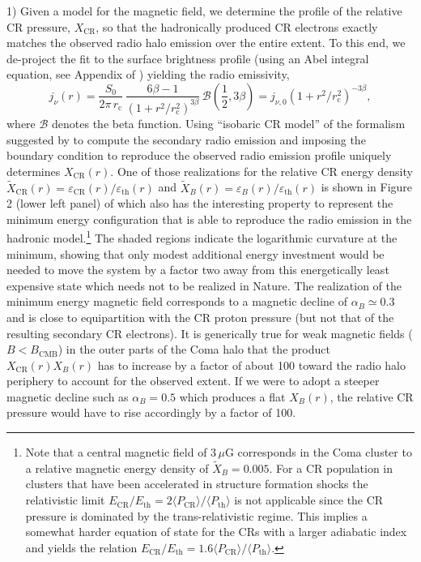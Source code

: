 \documentclass[12pt,manuscript]{aastex}
\newcommand{\rmn}{\mathrm}
\newcommand{\CR}{\mathrm{CR}}
\newcommand{\eps}{\varepsilon}
\newcommand{\bra}{\langle}
\newcommand{\ket}{\rangle}
\begin{document}
1) Given a model for the magnetic field, we determine the profile of the
relative CR pressure, $X_\CR$, so that the hadronically produced CR electrons
exactly matches the observed radio halo emission over the entire extent. To this
end, we de-project the fit to the surface brightness profile (using an Abel
integral equation, see Appendix of \citealt{article:PfrommerEnsslin:2004b}) yielding the
radio emissivity,
\begin{equation}
  \label{eq:Coma:radio}
  j_\nu (r) = \frac{S_0}{2\pi\, r_\rmn{c}}\, 
  \frac{6\beta - 1}{\left(1 + r^2/r_\rmn{c}^2\right)^{3 \beta}}\,
  \mathcal{B}\left(\frac{1}{2}, 3\beta\right)
  = j_{\nu,0} \left(1 + r^2/r_\rmn{c}^2\right)^{-3 \beta},
\end{equation}
where $\mathcal{B}$ denotes the beta function. Using ``isobaric CR model'' of
the formalism suggested by \citet{article:PfrommerEnsslin:2004b} to compute the secondary
radio emission and imposing the boundary condition to reproduce the observed
radio emission profile uniquely determines $X_\CR(r)$. One of those realizations
for the relative CR energy density $\tilde{X}_\CR(r) = \eps_\CR (r) /
\eps_\rmn{th} (r)$ and $\tilde{X}_B(r) = \eps_B (r) / \eps_\rmn{th} (r)$ is
shown in Figure 2 (lower left panel) of \citet{article:PfrommerEnsslin:2004a} which also
has the interesting property to represent the minimum energy configuration that
is able to reproduce the radio emission in the hadronic model.\footnote{Note
  that a central magnetic field of $3\,\mu$G corresponds in the Coma cluster to
  a relative magnetic energy density of $\tilde{X}_B=0.005$. For a CR population
  in clusters that have been accelerated in structure formation shocks the
  relativistic limit $E_\CR/E_\rmn{th} = 2 \bra P_\CR \ket / \bra P_\rmn{th}
  \ket$ is not applicable since the CR pressure is dominated by the
  trans-relativistic regime. This implies a somewhat harder equation of state
  for the CRs with a larger adiabatic index and yields the relation
  $E_\CR/E_\rmn{th} = 1.6 \bra P_\CR \ket / \bra P_\rmn{th} \ket$.}  The shaded
regions indicate the logarithmic curvature at the minimum, showing that only
modest additional energy investment would be needed to move the system by a
factor two away from this energetically least expensive state which needs not to
be realized in Nature.  The realization of the minimum energy magnetic field
corresponds to a magnetic decline of $\alpha_B\simeq0.3$ and is close to
equipartition with the CR proton pressure (but not that of the resulting
secondary CR electrons).  It is generically true for weak magnetic fields
($B<B_\rmn{CMB}$) in the outer parts of the Coma halo that the product
$X_\CR(r)X_B(r)$ has to increase by a factor of about 100 toward the radio halo
periphery to account for the observed extent.  If we were to adopt a steeper
magnetic decline such as $\alpha_B=0.5$ which produces a flat $X_B(r)$, the
relative CR pressure would have to rise accordingly by a factor of 100.
\end{document}
